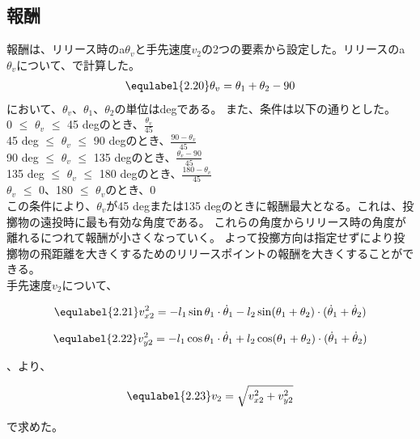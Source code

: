 \subsection{報酬}
報酬は、リリース時のa$\theta_{v}$と手先速度$v_{2}$の2つの要素から設定した。リリースのa$\theta_{v}$について、で計算した。
\begin{eqnarray}
  \equlabel{2.20}
  \theta_{v}=\theta_{1}+\theta_{2}-90
\end{eqnarray}
において、$\theta_{v}$、$\theta_{1}$、$\theta_{2}$の単位はdegである。
また、条件は以下の通りとした。\\
0 $\le$ $\theta_{v}$ $\le$ 45 degのとき、$\frac{\theta_{v}}{45}$\\
45 deg $\le$ $\theta_{v}$ $\le$ 90 degのとき、$\frac{90-\theta_{v}}{45}$\\
90 deg $\le$ $\theta_{v}$ $\le$ 135 degのとき、$\frac{\theta_{v}-90}{45}$\\
135 deg $\le$ $\theta_{v}$ $\le$ 180 degのとき、$\frac{180-\theta_{v}}{45}$\\
$\theta_{v}$ $\le$ 0、180 $\le$ $\theta_{v}$のとき、0\\

この条件により、$\theta_{v}$が45 degまたは135 degのときに報酬最大となる。これは、投擲物の遠投時に最も有効な角度である。
これらの角度からリリース時の角度が離れるにつれて報酬が小さくなっていく。
よって投擲方向は指定せずにより投擲物の飛距離を大きくするためのリリースポイントの報酬を大きくすることができる。\\
手先速度$v_{2}$について、

\begin{eqnarray}
  \equlabel{2.21}
  v_{x2}^{2}=-l_{1}\sin\theta_{1}\cdot\dot{\theta}_{1}-l_2\sin(\theta_{1}+\theta_{2})\cdot(\dot{\theta}_{1}+\dot{\theta}_{2})
\end{eqnarray}

\begin{eqnarray}
  \equlabel{2.22}
  v_{y2}^{2}=-l_{1}\cos\theta_{1}\cdot\dot{\theta}_{1}+l_2\cos(\theta_{1}+\theta_{2})\cdot(\dot{\theta}_{1}+\dot{\theta}_{2})
\end{eqnarray}

、より、

\begin{eqnarray}
  \equlabel{2.23}
  v_{2}=\sqrt{v_{x2}^{2}+v_{y2}^{2}}
\end{eqnarray}

で求めた。\\

